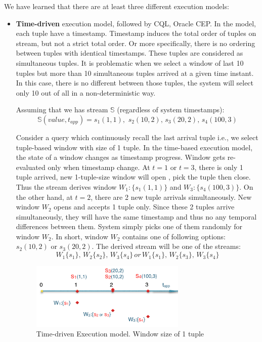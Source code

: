 We have learned that there are at least three different execution models:
\begin{itemize}
	\item \textbf{Time-driven} execution model, followed by CQL, Oracle CEP. In the model, each tuple have a timestamp. Timestamp induces the total order of tuples on stream, but not a strict total order. Or more specifically, there is no ordering between tuples with identical timestamps. These tuples are considered as simultaneous tuples. It is problematic when we select a window of last 10 tuples but more than 10 simultaneous tuples arrived at a given time instant. In this case, there is no different between those tuples, the system will select only 10 out of all in a non-deterministic way.
	
Assuming that we has stream $\mathbb{S}$ (regardless of system timestamps): 
	\begin{equation}
			\mathbb{S}(value, t_{app}) = s_1(1,1),\,\,s_2(10,2),\,s_3(20,2),\, s_4(100,3)
	\end{equation}
	

	
Consider a query which continuously recall the last arrival tuple i.e., we select tuple-based window with size of 1 tuple. In the time-based execution model,  the state of a window changes as timestamp progress. Window gets re-evaluated only when timestamp change. At $t=1$ or $t=3$, there is only 1 tuple arrived, new 1-tuple-size window will open , pick the tuple then close. Thus the stream derives window $W_1: \{s_1(1,1)\}$ and $W_3: \{s_4(100,3)\}$. On the other hand, at $t=2$, there are 2 new tuple arrivals simultaneously. New window $W_2$ opens and accepts 1 tuple only. Since these 2 tuples arrive simultaneously, they will have the same timestamp and thus no any temporal differences between them. System simply picks one of them randomly for window $W_2$. In short, window $W_2$ contains one of following options: $s_2(10,2)$ or $s_3(20,2)$. The derived stream will be one of the streams:
\begin{equation}
W_1\{s_1\},\, W_2\{s_2\},\, W_3\{s_4\}\, \textit{or}\, W_1\{s_1\},\, W_2\{s_3\},\, W_3\{s_4\}
\end{equation}

\begin{figure}[htbp!] 
\centering    
\includegraphics[width=0.7\textwidth]{time-driven}
\caption{Time-driven Execution model. Window size of 1 tuple}
\label{fig:time-driven}
\end{figure}
	

\end{itemize}
